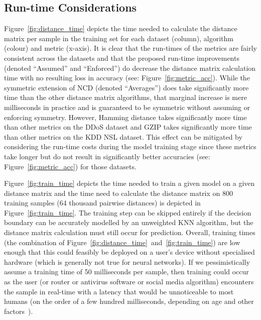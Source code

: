 \documentclass[preprint,12pt]{elsarticle}
\begin{document}
\subsection{Run-time Considerations}

Figure~\ref{fig:distance_time} depicts the time needed to calculate the distance matrix per sample in the training set for each dataset (column), algorithm (colour) and metric (x-axis).
It is clear that the run-times of the metrics are fairly consistent across the datasets and that the proposed run-time improvements (denoted ``Assumed'' and ``Enforced'') do decrease the distance matrix calculation time with no resulting loss in accuracy (see: Figure~\ref{fig:metric_acc}).
While the symmetric extension of NCD (denoted ``Averages'') does take significantly more time than the other distance matrix algorithms, that marginal increase is mere milliseconds in practice and is guaranteed to be symmetric without assuming or enforcing symmetry.
However, Hamming distance takes significantly more time than other metrics on the DDoS dataset and GZIP takes significantly more time than other metrics on the KDD NSL dataset.
This effect can be mitigated by considering the run-time costs during the model training stage since these metrics take longer but do not result in significantly better accuracies (see: Figure~\ref{fig:metric_acc}) for those datasets.

Figure~\ref{fig:train_time} depicts the time needed to train a given model on a given distance matrix and the time need to calculate the distance matrix on 800 training samples (64 thousand pairwise distances) is depicted in Figure~\ref{fig:train_time}.
The training step can be skipped entirely if the decision boundary can be accurately modelled by an unweighted KNN algorithm, but the distance matrix calculation must still occur for prediction.
Overall, training times (the combination of Figure~\ref{fig:distance_time}~and~\ref{fig:train_time}) are low enough that this could feasibly be deployed on a user's device without specialised hardware (which is generally not true for neural networks).
If we pessimistically assume a training time of 50 milliseconds per sample, then training could occur as the user (or router or antivirus software or social media algorithm) encounters the sample in real-time with a latency that would be unnoticeable to most humans (on the order of a  few hundred milliseconds, depending on age and other factors~\cite{reaction_time}).
\end{document}
